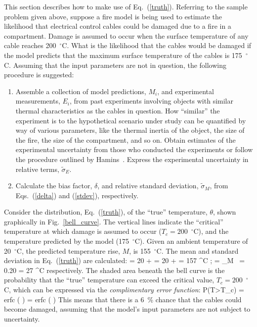 This section describes how to make use of Eq.~(\ref{truth}). Referring to the sample problem given above, suppose a fire model is being used to estimate the likelihood that
electrical control cables could be damaged due to a fire in a compartment.
Damage is assumed to occur when the surface temperature of any cable reaches 200~$^\circ$C.
What is the likelihood that the cables would be damaged if the
model predicts that the maximum surface temperature of the cables is 175~$^\circ$C. Assuming that the input parameters are not in question, the following
procedure is suggested:
\begin{enumerate}
\item Assemble a collection of model predictions, $M_i$, and experimental measurements, $E_i$, from
past experiments involving objects with similar thermal characteristics as the cables in question.
How ``similar'' the experiment is to the hypothetical scenario under study can be quantified by way of
various parameters, like the thermal inertia of the object, the size of the fire, the size of the compartment, and so on. Obtain estimates of the
experimental uncertainty from those who conducted the experiments or follow the procedure outlined by Hamins~\cite{NUREG_1824}. Express the
experimental uncertainty in relative terms, $\widetilde{\sigma}_E$.
\item Calculate the bias factor, $\delta$, and relative standard deviation, $\tilde{\sigma}_M$, from Eqs.~(\ref{delta}) and (\ref{stdev}), respectively.
\end{enumerate}
Consider the distribution, Eq.~(\ref{truth}), of the ``true'' temperature, $\theta$, shown graphically in Fig.~\ref{bell_curve}.
The vertical lines indicate the ``critical'' temperature at which damage is assumed to occur ($T_c=200$~$^\circ$C), and the temperature predicted by the
model (175~$^\circ$C). Given an ambient temperature of 20~$^\circ$C, the predicted temperature rise, $M$, is 155~$^\circ$C.
The mean and standard deviation in Eq.~(\ref{truth}) are calculated:
\be \mu = 20 +  = 20 +  = 157 \; ^\circ \hbox{C}  \quad ; \quad
   \sigma = \widetilde{\sigma}_M \,  = 0.20 \times {} = 27 \; ^\circ \hbox{C}  \ee
respectively. The shaded area beneath the bell curve is the probability that the ``true'' temperature can exceed the
critical value, $T_c=200$~$^\circ$C, which can be expressed via the {\em complimentary error function}:
\be P(T>T_c) =  \hbox{erfc} \left(  \right) =  \hbox{erfc} \left(  \right)   \ee
This means that there is a 6~\% chance that the cables could become damaged, assuming that the model's input parameters are not
subject to uncertainty.


